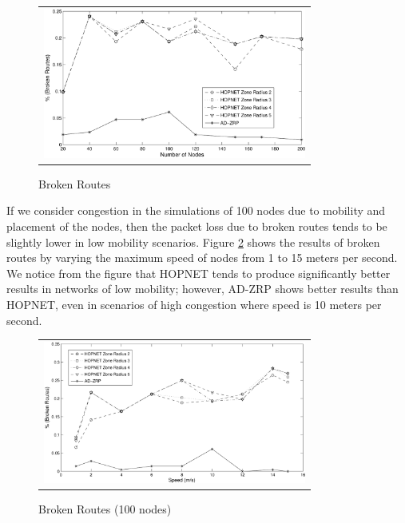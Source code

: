\documentclass[conference]{IEEEtran}
\begin{document}
\begin{figure}[htb]
\begin{tabular}{c}
\includegraphics[width=245pt]{fig/broken_routes.pdf}
\end{tabular}
\caption{Broken Routes}
\label{broken_routes}
\end{figure}

If we consider congestion in the simulations of 100 nodes due to mobility and placement of the nodes, then the packet loss due to broken routes tends to be slightly lower in low mobility scenarios.
Figure \ref{broken_routes-speed} shows the results of broken routes by varying the maximum speed of nodes from 1 to 15 meters per second.
We notice from the figure that HOPNET tends to produce significantly better results in networks of low mobility; however, AD-ZRP shows better results than HOPNET, even in scenarios of high congestion where speed is 10 meters per second.

\begin{figure}[htb]
\begin{tabular}{c}
\includegraphics[width=245pt]{fig/broken_routes-speed.pdf}
\end{tabular}
\caption{Broken Routes (100 nodes)}
\label{broken_routes-speed}
\end{figure}
\end{document}
